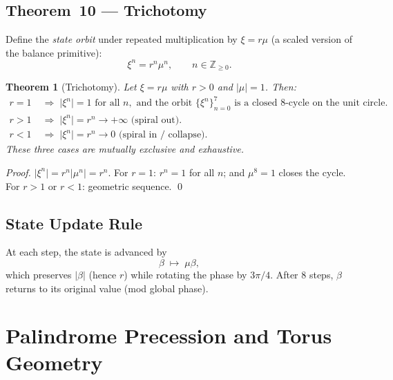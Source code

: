 \documentclass[12pt,a4paper]{article}
\theoremstyle{plain}
\newtheorem{theorem}{Theorem}[section]
\theoremstyle{definition}
\theoremstyle{remark}
\newcommand{\Z}{\mathbb{Z}}
\newcommand{\abs}[1]{\lvert #1 \rvert}
\begin{document}
\subsection{Theorem~10 — Trichotomy}

Define the \emph{state orbit} under repeated multiplication by $\xi = r\mu$
(a scaled version of the balance primitive):
\begin{equation}
  \xi^n = r^n \mu^n, \qquad n \in \Z_{\ge 0}.
  \label{eq:orbit}
\end{equation}

\begin{theorem}[Trichotomy]\label{thm:10}
  Let $\xi = r\mu$ with $r>0$ and $\abs{\mu}=1$.  Then:
  \begin{align}
    r = 1 &\;\Rightarrow\; \abs{\xi^n} = 1\text{ for all }n,
           \text{ and the orbit }\{\xi^n\}_{n=0}^{7}
           \text{ is a closed 8-cycle on the unit circle.}
           \label{eq:r1-closed}\\
    r > 1 &\;\Rightarrow\; \abs{\xi^n} = r^n \to +\infty
           \text{ (spiral out).}
           \label{eq:r-gt-1}\\
    r < 1 &\;\Rightarrow\; \abs{\xi^n} = r^n \to 0
           \text{ (spiral in / collapse).}
           \label{eq:r-lt-1}
  \end{align}
  These three cases are mutually exclusive and exhaustive.
\end{theorem}

\begin{proof}
  $\abs{\xi^n} = r^n \abs{\mu^n} = r^n$.
  For $r=1$: $r^n=1$ for all $n$; and $\mu^8=1$ closes the cycle.
  For $r>1$ or $r<1$: geometric sequence. \qed
\end{proof}

\subsection{State Update Rule}

At each step, the state is advanced by
\begin{equation}
  \beta \;\mapsto\; \mu\beta,
  \label{eq:mu-step}
\end{equation}
which preserves $\abs{\beta}$ (hence $r$) while rotating the phase by $3\pi/4$.
After 8 steps, $\beta$ returns to its original value (mod global phase).

\section{Palindrome Precession and Torus Geometry}
\label{sec:palindrome}
\end{document}
